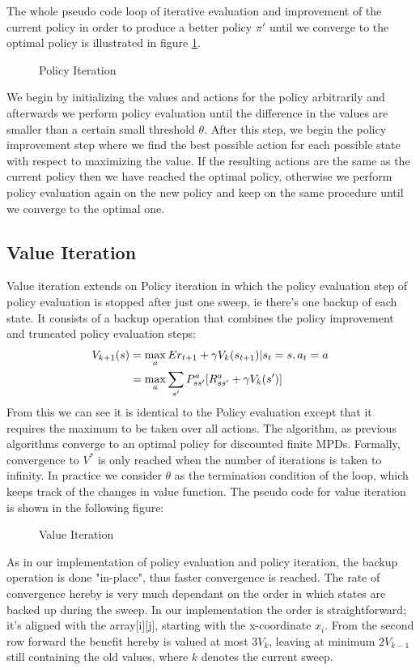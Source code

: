 \documentclass[paper=a4, fontsize=11pt]{scrartcl}
\numberwithin{equation}{section}		%
\numberwithin{figure}{section}			%
\numberwithin{table}{section}				%
\begin{document}
The whole pseudo code loop of iterative evaluation and improvement of the current policy in order to produce a better policy $\pi'$ until we converge to the optimal policy is illustrated in figure \ref{Policy Iteration}.

\begin{figure}[H] \centering
\caption{Policy Iteration ~\cite{suttonBarto}} \label{Policy Iteration}
\end{figure}

We begin by initializing the values and actions for the policy arbitrarily and afterwards we perform policy evaluation until the difference in the values are smaller than a certain small threshold $\theta$. After this step, we begin the policy improvement step where we find the best possible action for each possible state with respect to maximizing the value. If the resulting actions are the same as the current policy then we have reached the optimal policy, otherwise we perform policy evaluation again on the new policy and keep on the same procedure until we converge to the optimal one. 

\subsection{Value Iteration}
\label{VIter}
Value iteration extends on Policy iteration in which the policy evaluation step of policy evaluation is stopped after just one sweep, ie there's one backup of each state. It consists of a backup operation that combines the policy improvement and truncated policy evaluation steps:
\begin{align}
V_{k+1}(s) &= \max_{a} E{r_{t+1} + \gamma V_k(s_{t+1}) | s_t=s, a_t=a}\notag\\
& = \max_{a} \sum_{s'} P_{ss'}^a [R_{ss'}^a + \gamma V_k(s')]
\end{align}
From this we can see it is identical to the Policy evaluation except that it requires the maximum to be taken over all actions. The algorithm, as previous algorithms converge to an optimal policy for discounted finite MPDs. Formally, convergence to $V^{*}$ is only reached when the number of iterations is taken to infinity. In practice we consider $\theta$ as the termination condition of the loop, which keeps track of the changes in value function. The pseudo code for value iteration is shown in the following figure:
\begin{figure}[H] \centering
\caption{Value Iteration ~\cite{suttonBarto}} \label{Value Iteration}
\end{figure}
As in our implementation of policy evaluation and policy iteration, the backup operation is done "in-place", thus faster convergence is reached. The rate of convergence hereby is very much dependant on the order in which states are backed up during the sweep. In our implementation the order is straightforward; it's aligned with the array[i][j], starting with the x-coordinate $x_i$. From the second row forward the benefit hereby is valued at most $3V_{k}$, leaving at minimum $2V_{k-1}$ still containing the old values, where $k$ denotes the current sweep.
\end{document}

